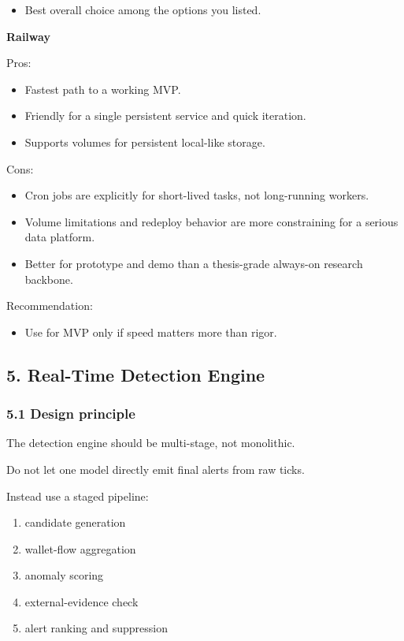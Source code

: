 \documentclass[
]{article}
\providecommand{\tightlist}{%
  \setlength{\itemsep}{0pt}\setlength{\parskip}{0pt}}
\begin{document}
\begin{itemize}
\tightlist
\item
  Best overall choice among the options you listed.
\end{itemize}

\textbf{Railway}

Pros:

\begin{itemize}
\tightlist
\item
  Fastest path to a working MVP.
\item
  Friendly for a single persistent service and quick iteration.
\item
  Supports volumes for persistent local-like storage.
\end{itemize}

Cons:

\begin{itemize}
\tightlist
\item
  Cron jobs are explicitly for short-lived tasks, not long-running
  workers.
\item
  Volume limitations and redeploy behavior are more constraining for a
  serious data platform.
\item
  Better for prototype and demo than a thesis-grade always-on research
  backbone.
\end{itemize}

Recommendation:

\begin{itemize}
\tightlist
\item
  Use for MVP only if speed matters more than rigor.
\end{itemize}

\subsection{5. Real-Time Detection
Engine}\label{5-real-time-detection-engine}

\subsubsection{5.1 Design principle}\label{51-design-principle}

The detection engine should be multi-stage, not monolithic.

Do not let one model directly emit final alerts from raw ticks.

Instead use a staged pipeline:

\begin{enumerate}
\def\labelenumi{\arabic{enumi}.}
\tightlist
\item
  candidate generation
\item
  wallet-flow aggregation
\item
  anomaly scoring
\item
  external-evidence check
\item
  alert ranking and suppression
\end{enumerate}
\end{document}
